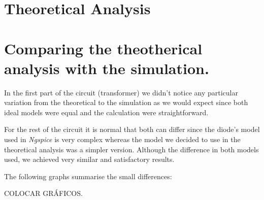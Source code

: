 \newpage
\section{Theoretical Analysis}
\label{sec:analysis}

\section{Comparing the theotherical analysis with the simulation.}
In the first part of the circuit (transformer) we didn't notice any particular variation from the theoretical to the simulation
as we would expect since both ideal models were equal and the calculation were straightforward.

For the rest of the circuit it is normal that both can differ since the diode's model used in \emph{Ngspice}
is very complex whereas the model we decided to use in the theoretical analysis was
a simpler version.
Although the difference in both models used, we achieved very similar and satisfactory results.

The following graphs summarise the small differences:

COLOCAR GRÁFICOS.

\newpage




